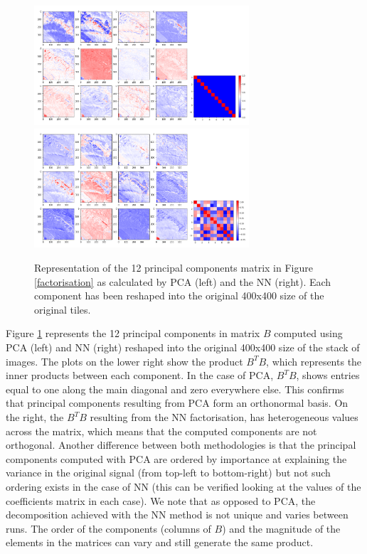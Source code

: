 \documentclass[essd, manuscript]{copernicus}
\begin{document}
\begin{figure}%
    {{\includegraphics[width=8cm]{fig4a.png} }}%
    {{\includegraphics[width=8cm]{fig4b.png} }}%
	\caption{Representation of the 12 principal components matrix in Figure \ref{factorisation} as calculated by PCA (left) and the NN (right). Each component has been reshaped into the original 400x400 size of the original tiles.}%
    \label{pcs}%
\end{figure}

Figure \ref{pcs} represents the 12 principal components in matrix $B$ computed using PCA (left) and NN (right) reshaped into the original 400x400 size of the stack of images. The plots on the lower right show the product $B^TB$, which represents the inner products between each component. In the case of PCA, $B^TB$, shows entries equal to one along the main diagonal and zero everywhere else. This confirms that principal components resulting from PCA form an orthonormal basis. On the right, the $B^TB$ resulting from the NN factorisation, has heterogeneous values across the matrix, which means that the computed components are not orthogonal. Another difference between both methodologies is that the principal components computed with PCA are ordered by importance at explaining the variance in the original signal (from top-left to bottom-right) but not such ordering exists in the case of NN (this can be verified looking at the values of the coefficients matrix in each case). We note that as opposed to PCA, the decomposition achieved with the NN method is not unique and varies between runs. The order of the components (columns of $B$) and the magnitude of the elements in the matrices can vary and still generate the same product.
\end{document}
